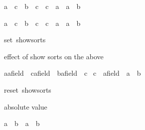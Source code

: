 \begin{isabellebody}
\begin{isamarkuptext}
\begin{isabelle}%
{\isacharparenleft}a\ {\isacharasterisk}\ c\ {\isacharequal}\ b\ {\isacharasterisk}\ c{\isacharparenright}\ {\isacharequal}\ {\isacharparenleft}c\ {\isacharequal}\ {\isacharparenleft}{}{\isasymColon}{\isacharprime}a{\isacharparenright}\ {\isasymor}\ a\ {\isacharequal}\ b{\isacharparenright}%
\end{isabelle}

\begin{isabelle}%
{\isacharparenleft}a\ {\isacharasterisk}\ c\ {\isacharequal}\ b\ {\isacharasterisk}\ c{\isacharparenright}\ {\isacharequal}\ {\isacharparenleft}c\ {\isacharequal}\ {\isacharparenleft}{}{\isasymColon}{\isacharprime}a{\isacharparenright}\ {\isasymor}\ a\ {\isacharequal}\ b{\isacharparenright}%
\end{isabelle}
%
\end{isamarkuptext}%
\isamarkuptrue%
set\ show{\isacharunderscore}sorts{\isacharasterisk}{\isacharbraceright}\isamarkupfalse%
%
\begin{isamarkuptext}%
effect of show sorts on the above

\begin{isabelle}%
{\isacharparenleft}{\isacharparenleft}a{\isasymColon}{\isacharprime}a{\isasymColon}field{\isacharparenright}\ {\isacharasterisk}\ {\isacharparenleft}c{\isasymColon}{\isacharprime}a{\isasymColon}field{\isacharparenright}\ {\isacharequal}\ {\isacharparenleft}b{\isasymColon}{\isacharprime}a{\isasymColon}field{\isacharparenright}\ {\isacharasterisk}\ c{\isacharparenright}\ {\isacharequal}\isanewline
{\isacharparenleft}c\ {\isacharequal}\ {\isacharparenleft}{}{\isasymColon}{\isacharprime}a{\isasymColon}field{\isacharparenright}\ {\isasymor}\ a\ {\isacharequal}\ b{\isacharparenright}%
\end{isabelle}
%
\end{isamarkuptext}%
\isamarkuptrue%
reset\ show{\isacharunderscore}sorts{\isacharasterisk}{\isacharbraceright}\isamarkupfalse%
%
\begin{isamarkuptext}%
absolute value

\begin{isabelle}%
{\isasymbar}a\ {\isacharasterisk}\ b{\isasymbar}\ {\isacharequal}\ {\isasymbar}a{\isasymbar}\ {\isacharasterisk}\ {\isasymbar}b{\isasymbar}%
\end{isabelle}


\end{isamarkuptext}
\end{isabellebody}
